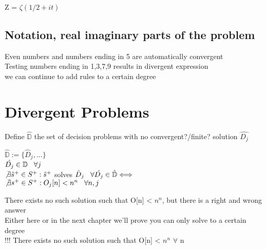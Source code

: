 \documentclass[11pt]{article}
\begin{document}
Z = $\zeta(1/2 + it)$

\subsection{Notation, real imaginary parts of the problem}
Even numbers and numbers ending in 5 are automatically convergent\\
Testing numbers ending in 1,3,7,9 results in divergent expression\\
we can continue to add rules to a certain degree




















\newpage
\section{Divergent Problems}
Define $\hat{\mathbb{D}}$ the set of decision problems with no convergent?/finite? solution $\hat{D_j}$\\
\begin{center}
$
\hat{\mathbb{D}} := \{\hat{D}_j,...\}
$
\\ \vspace{2mm}
$
\hat{D_j} \in \mathbb{D} \hspace{3mm} \forall j
$
\\ \vspace{2mm}
$
\not \exists \hat{s}^{+} \in S^{+} : \hat{s}^{+}$ solves $\hat{D}_j \hspace{3mm} \forall \hat{D_j} \in \hat{\mathbb{D}} \Longleftrightarrow 
$
\\
$
\not \exists s^{+} \in S^{+} : O_j \lbrack n \rbrack < n^n  \hspace{3mm} \forall n,j
$
\end{center}
There exists no such solution such that O[n] < $n^n$, but there is a right and wrong answer\\
Either here or in the next chapter we'll prove you can only solve to a certain degree\\
 !!! There exists no such solution such that O[n] < $n^n$ \hspace{3mm} $\forall$ n
 
\end{document}
